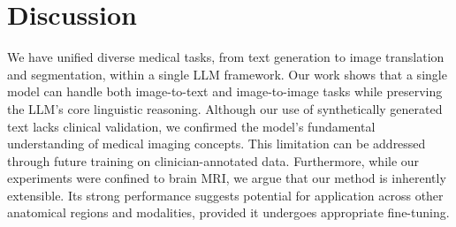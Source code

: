 \section{Discussion}

We have unified diverse medical tasks, from text generation to image translation and segmentation, within a single LLM framework. Our work shows that a single model can handle both image-to-text and image-to-image tasks while preserving the LLM's core linguistic reasoning. Although our use of synthetically generated text lacks clinical validation, we confirmed the model's fundamental understanding of medical imaging concepts. This limitation can be addressed through future training on clinician-annotated data. Furthermore, while our experiments were confined to brain MRI, we argue that our method is inherently extensible. Its strong performance suggests potential for application across other anatomical regions and modalities, provided it undergoes appropriate fine-tuning.

